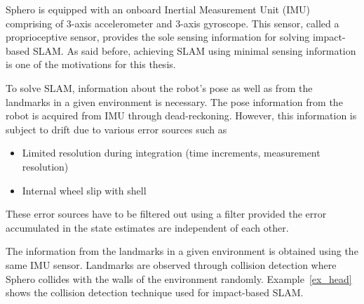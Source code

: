 Sphero is equipped with an onboard Inertial Measurement Unit (IMU) comprising of 3-axis accelerometer and 3-axis gyroscope. This sensor, called a proprioceptive sensor, provides the sole sensing information for solving impact-based SLAM. As said before, achieving SLAM using minimal sensing information is one of the motivations for this thesis. 

To solve SLAM, information about the robot's pose as well as from the landmarks in a given environment is necessary. The pose information from the robot is acquired from IMU through dead-reckoning. However, this information is subject to drift due to various error sources such as 
\begin{itemize}
\item Limited resolution during integration (time increments, measurement resolution)
\item Internal wheel slip with shell
\end{itemize}

These error sources have to be filtered out using a filter provided the error accumulated in the state estimates are independent of each other. 

The information from the landmarks in a given environment is obtained using the same IMU sensor. Landmarks are observed through collision detection where Sphero collides with the walls of the environment randomly. Example~\ref{ex_head} shows the collision detection technique used for impact-based SLAM.

